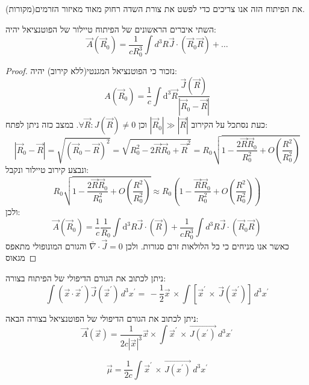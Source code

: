 \documentclass{tstextbook}
\begin{document}
את הפיתוח הזה אנו צריכים כדי לפשט את צורת השדה רחוק מאוד מאיזור הזרמים(מקורות).

\begin{proposition}
השתי איברים הראשונים של הפיתוח טיילור של הפוטנציאל יהיה:
$$\vec{A}\left( \vec{R}_{0} \right)=\frac{1}{cR_{0}^3}\int d^3R\vec{J}\cdot\left( \vec{R}_{0}\vec{R} \right)+\dots$$

\end{proposition}
\begin{proof}
נזכור כי הפוטנציאל המגנטי(ללא קירוב) יהיה:
$$A\left( \vec{R}_{0} \right)=\frac{1}{c}\int \mathrm{d}^3 \vec{R} \frac{\vec{J}\left( \vec{R} \right)}{\left\lvert  \vec{R}_{0}-\vec{R}  \right\rvert }$$
כעת נסתכל על הקירוב \(\left\lvert  \vec{R}_{0}  \right\rvert\gg \left\lvert  \vec{R}  \right\rvert\) וכן \(\forall \vec{R}: J\left( \vec{R} \right)\neq 0\). במצב כזה ניתן לפתח:
$$\left\lvert  \vec{R}_{0}-\vec{R}  \right\rvert =\sqrt{ \left( \vec{R}_{0}-\vec{R} \right)^2 }=\sqrt{ R_{0}^2-2\vec{R}\vec{R}_{0}+\vec{R}^2 }=R_{0}\sqrt{ 1-\frac{2\vec{R}\vec{R}_{0}}{R_{0}^2}+O\left( \frac{R^2}{R_{0}^2} \right) }$$
ונבצע קירוב טיילור ונקבל:
$$R_{0}\sqrt{ 1-\frac{2\vec{R}\vec{R}_{0}}{R_{0}^2}+O\left( \frac{R^2}{R_{0}^2} \right) } \approx R_{0}\left( 1-\frac{\vec{R}\vec{R}_{0}}{R_{0}^2}+O\left( \frac{R^2}{R_{0}^2} \right) \right)$$
ולכן:
$$\vec{A}\left( \vec{R}_{0} \right)=\frac{1}{c} \frac{1}{R_{0}}\int\mathrm{d^3}R \vec{J}\cdot\left( \vec{R} \right)+\frac{1}{cR_{0}^3}\int d^3R\vec{J}\cdot\left( \vec{R}_{0}\vec{R} \right)$$
כאשר אנו מניחים כי כל הלולאות זרם סגורות. ולכן \(\bar{\nabla} \cdot \vec{J}=0\) והגורם המונופולי מתאפס מגאוס

\end{proof}
\begin{proposition}
ניתן לכתוב את הגורם הדיפולי של הפיתוח בצורה:
$$\int\!(\vec{x}\cdot\vec{x}^{\prime})\vec{J}(\vec{x}^{\prime})\,d^{3}x^{\prime}=\,-{\textstyle{\frac{1}{2}}}\vec{x}\,\times\int\![\vec{x}^{\prime}\,\times\,\vec{J}(\vec{x}^{\prime})]\,d^{3}x^{\prime}$$

\end{proposition}
\begin{corollary}
ניתן לכתוב את הגורם הדיפולי של הפוטנציאל בצורה הבאה:
$$\vec{A}\left( \vec{x} \right)={\frac{1}{2c|\vec{x}|^3}}\vec{x} \times\int\vec{x}^{\prime}\,\times\,\vec{J\left( x^{\prime} \right)}\ d^{3}x^{\prime}$$

\end{corollary}
\begin{definition}
$$\vec{\mu}={\frac{1}{2c}}\int\vec{x}^{\prime}\,\times\,\vec{J\left( x^{\prime} \right)}\ d^{3}x^{\prime}$$

\end{definition}
\end{document}
